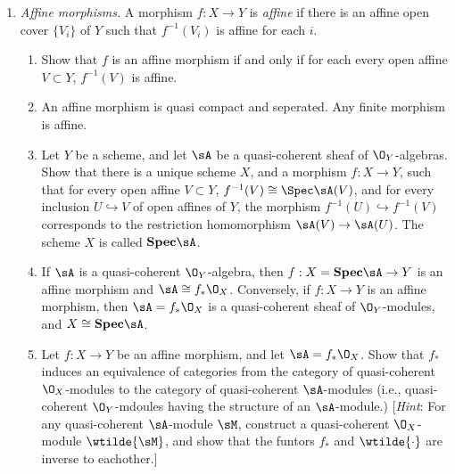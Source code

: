 \documentclass[12pt]{amsart}
\newcommand{\SPEC}{\text{\bf{Spec}}}
\begin{document}
\begin{enumerate}
  \item[5.17.] {
      \emph{Affine morphisms.} A morphism $f:X\to Y$ is \emph{affine} if there is an affine open cover $\{V_i\}$ of $Y$ such that $f^{-1}(V_i)$ is affine for each $i$.
      \begin{enumerate}
        \item Show that $f$ is an affine morphism if and only if for each every open affine $V\subset Y$, $f^{-1}(V)$ is affine.
        \item An affine morphism is quasi compact and seperated.
          Any finite morphism is affine.
        \item Let $Y$ be a scheme, and let $\sA$ be a quasi-coherent sheaf of $\O_Y$-algebras.
          Show that there is a unique scheme $X$, and a morphism $f:X\to Y$, such that for every open affine $V\subset Y$, $f^{-1}(V)\cong \Spec\sA(V)$, and for every inclusion $U\hookrightarrow V$ of open affines of $Y$, the morphism $f^{-1}(U)\hookrightarrow f^{-1}(V)$ corresponds to the restriction homomorphism $\sA(V)\to \sA(U)$.
          The scheme $X$ is called $\SPEC \sA$.
        \item If $\sA$ is a quasi-coherent $\O_Y$-algebra, then $f:X=\SPEC\sA\to Y$ is an affine morphism and $\sA\cong f_*\O_X$.
          Conversely, if $f:X\to Y$ is an affine morphism, then $\sA=f_*\O_X$ is a quasi-coherent sheaf of $\O_Y$-modules, and $X\cong \SPEC\sA$.
        \item Let $f:X\to Y$ be an affine morphism, and let $\sA=f_*\O_X$.
          Show that $f_*$ induces an equivalence of categories from the category of quasi-coherent $\O_X$-modules to the category of quasi-coherent $\sA$-modules (i.e., quasi-coherent $\O_Y$-mdoules having the structure of an $\sA$-module.)
          [\emph{Hint}: For any quasi-coherent $\sA$-module $\sM$, construct a quasi-coherent $\O_X$-module $\wtilde{\sM}$, and show that the funtors $f_*$ and $\wtilde{\cdot}$ are inverse to eachother.]
      \end{enumerate}
    }
\end{enumerate}
\end{document}
